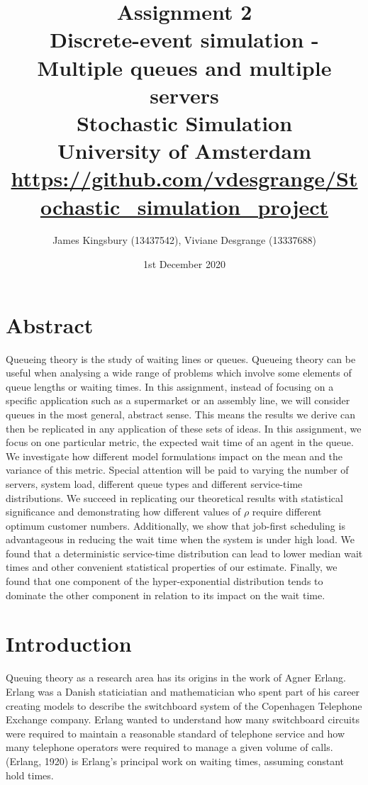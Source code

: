 \documentclass{article}
\title{Assignment 2 \\  Discrete-event simulation - Multiple queues and multiple servers \\ \large Stochastic Simulation \\University of Amsterdam\\
\href{https://github.com/vdesgrange/Stochastic_simulation_project}{https://github.com/vdesgrange/Stochastic\_simulation\_project}}
\author{James Kingsbury (13437542), Viviane Desgrange (13337688) }
\date{1st December 2020}
\begin{document}
    \begin{titlingpage}
        \maketitle
    \end{titlingpage}


    \section*{Abstract}
    Queueing theory is the study of waiting lines or queues. Queueing theory can be useful when analysing a wide range of problems which involve some elements of queue lengths or waiting times. In this assignment, instead of focusing on a specific application such as a supermarket or an assembly line, we will consider queues in the most general, abstract sense. This means the results we derive can then be replicated in any application of these sets of ideas. In this assignment, we focus on one particular metric, the expected wait time of an agent in the queue. We investigate how different model formulations impact on the mean and the variance of this metric. Special attention will be paid to varying the number of servers, system load, different queue types and different service-time distributions. We succeed in replicating our theoretical results with statistical significance and demonstrating how different values of $\rho$ require different optimum customer numbers. Additionally, we show that job-first scheduling is advantageous in reducing the wait time when the system is under high load. We found that a deterministic service-time distribution can lead to lower median wait times and other convenient statistical properties of our estimate. Finally, we found that one component of the hyper-exponential distribution tends to dominate the other component in relation to its impact on the wait time.

    \section*{Introduction}
    Queuing theory as a research area has its origins in the work of Agner Erlang. Erlang was a Danish staticiatian and mathematician who spent part of his career creating models to describe the switchboard system of the Copenhagen Telephone Exchange company. Erlang wanted to understand how many switchboard circuits were required to maintain a reasonable standard of telephone service and how many telephone operators were required to manage a given volume of calls. (Erlang, 1920) is Erlang's principal work on waiting times, assuming constant hold times.
\end{document}
